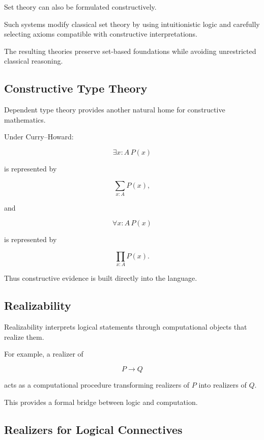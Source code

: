 Set theory can also be formulated constructively.

Such systems modify classical set theory by using intuitionistic logic and
carefully selecting axioms compatible with constructive interpretations.

The resulting theories preserve set-based foundations while avoiding
unrestricted classical reasoning.

\subsection{Constructive Type Theory}
\label{subsec:constructive-type-theory}

Dependent type theory provides another natural home for constructive
mathematics.

Under Curry--Howard:

\[
\boxed{
\exists x:A\,P(x)
}
\]

is represented by

\[
\boxed{
\sum_{x:A}P(x),
}
\]

and

\[
\boxed{
\forall x:A\,P(x)
}
\]

is represented by

\[
\boxed{
\prod_{x:A}P(x).
}
\]

Thus constructive evidence is built directly into the language.

\subsection{Realizability}
\label{subsec:realizability-preview}

Realizability interprets logical statements through computational objects
that realize them.

For example, a realizer of

\[
P\rightarrow Q
\]

acts as a computational procedure transforming realizers of \(P\) into
realizers of \(Q\).

This provides a formal bridge between logic and computation.

\subsection{Realizers for Logical Connectives}
\label{subsec:realizers-logical-connectives}

